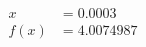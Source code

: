 \documentclass[preview]{standalone}
\begin{document}
\begin{align*}
x &= 0.0003\\f(x) &= 4.0074987
\end{align*}
\end{document}
